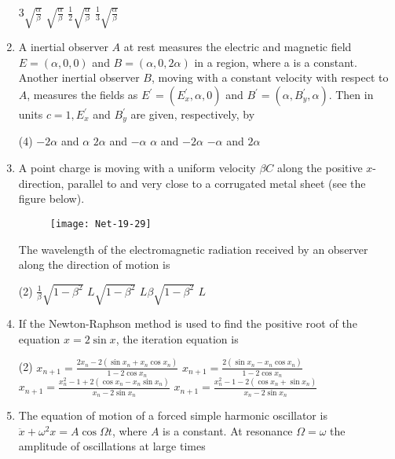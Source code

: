 \begin{enumerate}
\begin{tasks}
	\task[\textbf{a.}]$3 \sqrt{\frac{\alpha}{\beta}}$
	\task[\textbf{b.}]$\sqrt{\frac{\alpha}{\beta}}$
	\task[\textbf{c.}]$\frac{1}{2} \sqrt{\frac{\alpha}{\beta}}$
	\task[\textbf{d.}] $\frac{1}{3} \sqrt{\frac{\alpha}{\beta}}$
\end{tasks}
\item  A inertial observer $A$ at rest measures the electric and magnetic field $E=(\alpha, 0,0)$ and $B=(\alpha, 0,2 \alpha)$ in a region, where a is a constant. Another inertial observer $B$, moving with a constant velocity with respect to $A$, measures the fields as $E^{\prime}=\left(E_{x}^{\prime}, \alpha, 0\right)$ and $B^{\prime}=\left(\alpha, B_{y}^{\prime}, \alpha\right)$. Then in units $c=1, E_{x}^{\prime}$ and $B_{y}^{\prime}$ are given, respectively, by
 \begin{tasks}(4)
	\task[\textbf{a.}]$-2 \alpha$ and $\alpha$
	\task[\textbf{b.}] $2 \alpha$ and $-\alpha$
	\task[\textbf{c.}] $\alpha$ and $-2 \alpha$
	\task[\textbf{d.}] $-\alpha$ and $2 \alpha$
\end{tasks}
\item  A point charge is moving with a uniform velocity $\beta C$ along the positive $x$-direction, parallel to and very close to a corrugated metal sheet (see the figure below).
\begin{figure}[H]
	\centering
	\texttt{[image: Net-19-29]}
\end{figure}
The wavelength of the electromagnetic radiation received by an observer along the direction of motion is
 \begin{tasks}(2)
	\task[\textbf{a.}]$\frac{1}{\beta} \sqrt{1-\beta^{2}}$
	\task[\textbf{b.}]$L \sqrt{1-\beta^{2}}$
	\task[\textbf{c.}]$L \beta \sqrt{1-\beta^{2}}$
	\task[\textbf{d.}] $L$
\end{tasks}
\item If the Newton-Raphson method is used to find the positive root of the equation $x=2 \sin x$, the iteration equation is
 \begin{tasks}(2)
	\task[\textbf{a.}]$x_{n+1}=\frac{2 x_{n}-2\left(\sin x_{n}+x_{n} \cos x_{n}\right)}{1-2 \cos x_{n}}$
	\task[\textbf{b.}]$x_{n+1}=\frac{2\left(\sin x_{n}-x_{n} \cos x_{n}\right)}{1-2 \cos x_{n}}$
	\task[\textbf{c.}] $x_{n+1}=\frac{x_{n}^{2}-1+2\left(\cos x_{n}-x_{n} \sin x_{n}\right)}{x_{n}-2 \sin x_{n}}$
	\task[\textbf{d.}]  $x_{n+1}=\frac{x_{n}^{2}-1-2\left(\cos x_{n}+\sin x_{n}\right)}{x_{n}-2 \sin x_{n}}$
\end{tasks}
\item  The equation of motion of a forced simple harmonic oscillator is $\ddot{x}+\omega^{2} x=A \cos \Omega t$, where $A$ is a constant. At resonance $\Omega=\omega$ the amplitude of oscillations at large times

\end{enumerate}
